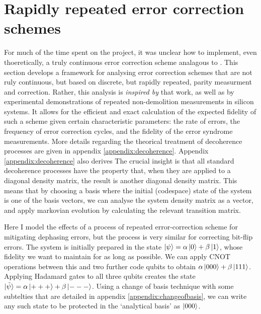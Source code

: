 \documentclass{report}
\begin{document}
\section{Rapidly repeated error correction schemes} \label{sec:repeat_analysis}
For much of the time spent on the project, it was unclear how to implement, even thoeretically, a truly continuous error correction scheme analagous to \cite{Dressel2022}. This section develops a framework for analysing error correction schemes that are not ruly continuous, but based on discrete, but rapidly repeated, parity measurment and correction. Rather, this analysis is \textit{inspired by} that work, as well as by experimental demonstrations of repeated non-demolition measurements in silicon systems\cite{Nakajima2019}\cite{Xue2020}. It allows for the efficient and exact calculation of the expected fidelity of such a scheme given certain characteristic parameters: the rate of errors, the frequency of error correction cycles, and the fidelity of the error syndrome measurements.
More details regarding the theorical treatment of decoherence processes are given in appendix \ref{appendix:decoherence}. Appendix \ref{appendix:decoherence} also derives The crucial insight is that all standard decoherence processes have the property that, when they are applied to a diagonal density matrix, the result is another diagonal density matrix. This means that by choosing a basis where the initial (codespace) state of the system is one of the basis vectors, we can analyse the system density matrix as a vector, and apply markovian evolution by calculating the relevant transition matrix. 

Here I model the effects of a process of repeated error-correction scheme for mitigating dephasing errors, but the process is very similar for correcting bit-flip errors. The system is initially prepared in the state $\ket{\psi} = \alpha \ket{0} + \beta \ket{1}$, whose fidelity we want to maintain for as long as possible. We can apply CNOT operations between this and two further code qubits to obtain $\alpha \ket{000} + \beta \ket{111}$. Applying Hadamard gates to all three qubits creates the state $\ket{\tilde{\psi}} = \alpha \ket{+++} + \beta \ket{---}$. Using a change of basis technique with some subtelties that are detailed in appendix \ref{appendix:changeofbasis}, we can write any such state to be protected in the `analytical basis' as $\ket{000}$.
\end{document}
